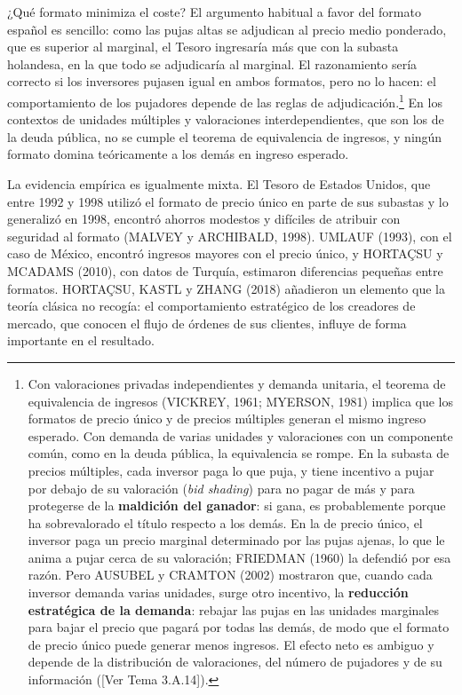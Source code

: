 \documentclass[10pt,a4paper]{article}
\newcommand{\authorfont}[1]{{\fontfamily{EBGaramond-TLF}\selectfont #1}}
\begin{document}
¿Qué formato minimiza el coste? El argumento habitual a favor del formato español es sencillo: como las pujas altas se adjudican al precio medio ponderado, que es superior al marginal, el Tesoro ingresaría más que con la subasta holandesa, en la que todo se adjudicaría al marginal. El razonamiento sería correcto si los inversores pujasen igual en ambos formatos, pero no lo hacen: el comportamiento de los pujadores depende de las reglas de adjudicación.\footnote{%
    Con valoraciones privadas independientes y demanda unitaria, el teorema de equivalencia de ingresos (VICKREY, 1961; MYERSON, 1981) implica que los formatos de precio único y de precios múltiples generan el mismo ingreso esperado. Con demanda de varias unidades y valoraciones con un componente común, como en la deuda pública, la equivalencia se rompe. En la subasta de precios múltiples, cada inversor paga lo que puja, y tiene incentivo a pujar por debajo de su valoración (\textit{bid shading}) para no pagar de más y para protegerse de la \textbf{maldición del ganador}: si gana, es probablemente porque ha sobrevalorado el título respecto a los demás. En la de precio único, el inversor paga un precio marginal determinado por las pujas ajenas, lo que le anima a pujar cerca de su valoración; FRIEDMAN (1960) la defendió por esa razón. Pero AUSUBEL y CRAMTON (2002) mostraron que, cuando cada inversor demanda varias unidades, surge otro incentivo, la \textbf{reducción estratégica de la demanda}: rebajar las pujas en las unidades marginales para bajar el precio que pagará por todas las demás, de modo que el formato de precio único puede generar menos ingresos. El efecto neto es ambiguo y depende de la distribución de valoraciones, del número de pujadores y de su información ([\authorfont{Ver Tema 3.A.14}]).
} En los contextos de unidades múltiples y valoraciones interdependientes, que son los de la deuda pública, no se cumple el teorema de equivalencia de ingresos, y ningún formato domina teóricamente a los demás en ingreso esperado.

La evidencia empírica es igualmente mixta. El Tesoro de Estados Unidos, que entre 1992 y 1998 utilizó el formato de precio único en parte de sus subastas y lo generalizó en 1998, encontró ahorros modestos y difíciles de atribuir con seguridad al formato (MALVEY y ARCHIBALD, 1998). UMLAUF (1993), con el caso de México, encontró ingresos mayores con el precio único, y HORTAÇSU y MCADAMS (2010), con datos de Turquía, estimaron diferencias pequeñas entre formatos. HORTAÇSU, KASTL y ZHANG (2018) añadieron un elemento que la teoría clásica no recogía: el comportamiento estratégico de los creadores de mercado, que conocen el flujo de órdenes de sus clientes, influye de forma importante en el resultado.
\end{document}
